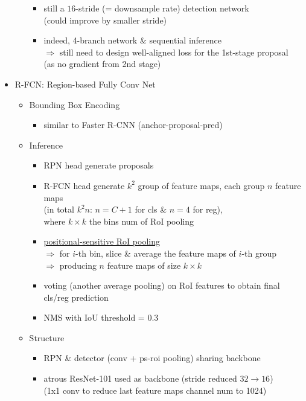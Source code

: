\begin{itemize}
\begin{itemize}
\begin{itemize}
		\item still a $16$-stride (= downsample rate) detection network \\
		(could improve by smaller stride)
		\item indeed, 4-branch network \& sequential inference \\
		$\Rightarrow$ still need to design well-aligned loss for the 1st-stage proposal \\
		(as no gradient from 2nd stage)
		\end{itemize}
	\end{itemize}

\item R-FCN: Region-based Fully Conv Net
	\begin{itemize}
	\item Bounding Box Encoding
		\begin{itemize}
		\item similar to Faster R-CNN (anchor-proposal-pred)
		\end{itemize}
	\item Inference
		\begin{itemize}
		\item RPN head generate proposals
		\item R-FCN head generate $k^2$ group of feature maps, each group $n$ feature maps \\
		(in total $k^2n$: $n=C+1$ for cls \& $n=4$ for reg), \\
		where $k\times k$ the bins num of RoI pooling
		\item \hyperref[DL_Layers_Pooling_psroi]{positional-sensitive RoI pooling} \\
		$\Rightarrow$ for $i$-th bin, slice \& average the feature maps of $i$-th group \\
		$\Rightarrow$ producing $n$ feature maps of size $k\times k$
		\item voting (another average pooling) on RoI features to obtain final cls/reg prediction
		\item NMS with IoU threshold = 0.3
		\end{itemize}
	\item Structure
		\begin{itemize}
		\item RPN \& detector (conv + ps-roi pooling) sharing backbone
		\item atrous ResNet-101 used as backbone (stride reduced $32\rightarrow16$) \\
		(1x1 conv to reduce last feature maps channel num to 1024)

\end{itemize}
\end{itemize}
\end{itemize}
